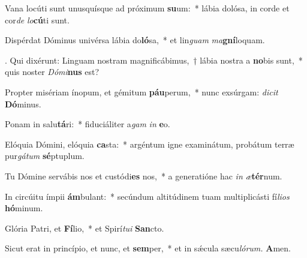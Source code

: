 \item Vana locúti sunt unusquísque ad próximum \textbf{su}um:~* lábia dolósa, in corde et cor\textit{de} \textit{lo}\textbf{cú}ti sunt.
\item Dispérdat Dóminus univérsa lábia do\textbf{ló}sa,~* et lin\textit{guam} \textit{ma}\textbf{gní}loquam.
\item. Qui dixérunt: Linguam nostram magnificábimus,~† lábia nostra a \textbf{no}bis sunt,~* quis noster \textit{Dómi}\textbf{nus} est?
\item Propter misériam ínopum, et gémitum \textbf{páu}perum,~* nunc exsúrgam: \textit{dicit} \textbf{Dó}minus.
\item Ponam in salu\textbf{tá}ri:~* fiduciáliter a\textit{gam} \textit{in} \textbf{e}o.
\item Elóquia Dómini, elóquia \textbf{ca}sta:~* argéntum igne examinátum, probátum terræ pur\textit{gátum} \textbf{sé}ptuplum.
\item Tu Dómine servábis nos et custódi\textbf{es} nos,~* a generatióne hac \textit{in} \textit{æ}\textbf{tér}num.
\item In circúitu ímpii \textbf{ám}bulant:~* secúndum altitúdinem tuam multiplicásti fí\hspace{0.02em}\textit{lios} \textbf{hó}minum.
\item Glória Patri, et \textbf{Fí}lio,~* et Spirí\tinyhspace\textit{tui} \textbf{San}cto.
\item Sicut erat in princípio, et nunc, et \textbf{sem}per,~* et in sǽcula sæcu\tinyhspace\textit{lórum.} \textbf{A}men.
